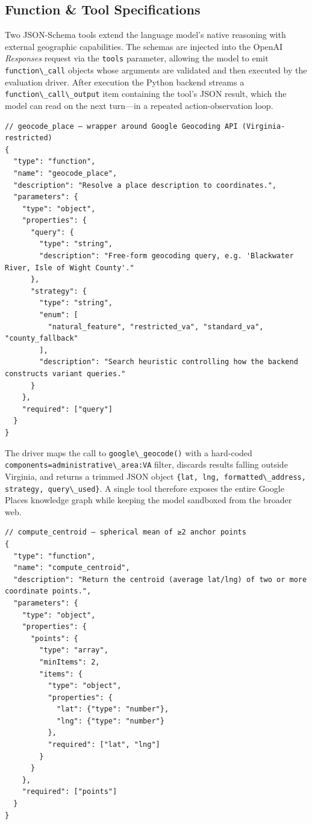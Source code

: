 \subsection{Function \& Tool
Specifications}\label{a.4-function-tool-specifications}

Two JSON-Schema tools extend the language model's native reasoning with
external geographic capabilities. The schemas are injected into the
OpenAI \emph{Responses} request via the \passthrough{\lstinline!tools!}
parameter, allowing the model to emit
\passthrough{\lstinline!function\_call!} objects whose arguments are
validated and then executed by the evaluation driver. After execution
the Python backend streams a
\passthrough{\lstinline!function\_call\_output!} item containing the
tool's JSON result, which the model can read on the next turn---in a
repeated action-observation loop.

\begin{lstlisting}
// geocode_place – wrapper around Google Geocoding API (Virginia-restricted)
{
  "type": "function",
  "name": "geocode_place",
  "description": "Resolve a place description to coordinates.",
  "parameters": {
    "type": "object",
    "properties": {
      "query": {
        "type": "string",
        "description": "Free-form geocoding query, e.g. 'Blackwater River, Isle of Wight County'."
      },
      "strategy": {
        "type": "string",
        "enum": [
          "natural_feature", "restricted_va", "standard_va", "county_fallback"
        ],
        "description": "Search heuristic controlling how the backend constructs variant queries."
      }
    },
    "required": ["query"]
  }
}
\end{lstlisting}

The driver maps the call to \passthrough{\lstinline!google\_geocode()!}
with a hard-coded
\passthrough{\lstinline!components=administrative\_area:VA!} filter,
discards results falling outside Virginia, and returns a trimmed JSON
object
\passthrough{\lstinline!\{lat, lng, formatted\_address, strategy, query\_used\}!}.
A single tool therefore exposes the entire Google Places knowledge graph
while keeping the model sandboxed from the broader web.

\begin{lstlisting}
// compute_centroid – spherical mean of ≥2 anchor points
{
  "type": "function",
  "name": "compute_centroid",
  "description": "Return the centroid (average lat/lng) of two or more coordinate points.",
  "parameters": {
    "type": "object",
    "properties": {
      "points": {
        "type": "array",
        "minItems": 2,
        "items": {
          "type": "object",
          "properties": {
            "lat": {"type": "number"},
            "lng": {"type": "number"}
          },
          "required": ["lat", "lng"]
        }
      }
    },
    "required": ["points"]
  }
}
\end{lstlisting}


